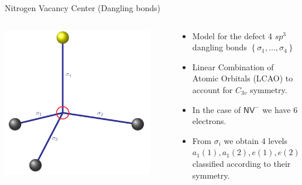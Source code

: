 \documentclass[notes=hide]{beamer}
\begin{document}
\begin{frame}{Nitrogen Vacancy Center (Dangling bonds)}
  \begin{columns}
    \begin{column}{0.5\textwidth}
\begin{center}
    \includegraphics[width=0.9\textwidth]{images/folien_dangling.png}
  \end{center}
    \end{column}
    \begin{column}{0.5\textwidth}
      \begin{itemize}
        \item Model for the defect 4 $ sp^{3} $ dangling bonds $ \left \{ \sigma _{1}, \ldots, \sigma _{4} \right \} $
        \item Linear Combination of Atomic Orbitals (LCAO) to
          account for $ C_{3v} $ symmetry.
        \item In the case of $ \mathsf{NV}^{-} $ we have
         6  electrons.
        \item From $ \sigma _{i} $ we obtain 4 levels $ a_1(1), a_1(2), e(1), e(2) $ classified according to their symmetry.

      \end{itemize}
    \end{column}
  \end{columns}
  
\end{frame}
\end{document}
